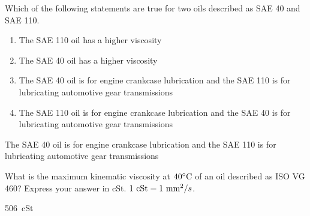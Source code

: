 \documentclass[12pt]{article}
\begin{document}
\begin{question}

Which of the following statements are true for two oils described as SAE 40 and SAE 110.

\begin{enumerate}
  \item The SAE 110 oil has a higher viscosity
  \item The SAE 40 oil has a higher viscosity
  \item The SAE 40 oil is for engine crankcase lubrication and the SAE 110 is for lubricating automotive gear transmissions
  \item The SAE 110 oil is for engine crankcase lubrication and the SAE 40 is for lubricating automotive gear transmissions
\end{enumerate}

\begin{solution}
The SAE 40 oil is for engine crankcase lubrication and the SAE 110 is for lubricating automotive gear transmissions
\end{solution}

\end{question}

\begin{question}

What is the maximum kinematic viscosity at $40^\circ {\rm C}$ of an oil described as ISO VG 460?  Express your answer in cSt.  $1~{\rm cSt}=1~{\rm mm}^2/s$.

\begin{solution}
506~cSt
\end{solution}

\end{question}
\end{document}
